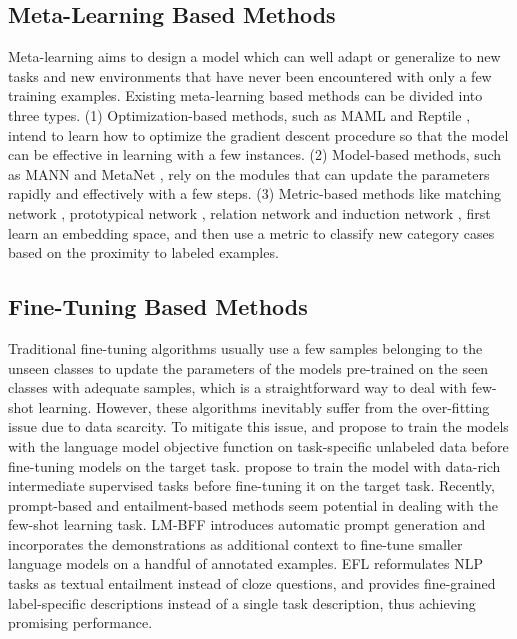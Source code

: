 \documentclass[letterpaper]{article} %
\begin{document}
\subsection{Meta-Learning Based Methods}
Meta-learning aims to design a model which can well adapt or generalize to new tasks and new environments that have never been encountered with only a few training examples. Existing meta-learning based methods can be divided into three types. (1) Optimization-based methods, such as MAML \cite{finn2017model} and Reptile \cite{DBLP:journals/corr/abs-1803-02999}, intend to learn how to optimize the gradient descent procedure so that the model can be effective in learning with a few instances. (2) Model-based methods, such as MANN \cite{mann} and MetaNet \cite{metanet}, rely on the modules that can update the parameters rapidly and effectively with a few steps. (3) Metric-based methods like matching network \cite{matchingnet}, prototypical network \cite{snell2017prototypical}, relation network \cite{relationnet} and induction network \cite{DBLP:conf/emnlp/GengLLZJS19}, first learn an embedding space, and then use a metric to classify new category cases based on the proximity to labeled examples.

\subsection{Fine-Tuning Based Methods}
Traditional fine-tuning algorithms usually use a few samples belonging to the unseen classes to update the parameters of the models pre-trained on the seen classes with adequate samples, which is a straightforward way to deal with few-shot learning. However, these algorithms inevitably suffer from the over-fitting issue due to data scarcity. To mitigate
this issue, \citet{howard-ruder-2018-universal} and \citet{gururangan-etal-2020-dont} propose to train the models with the language model objective function on task-specific unlabeled data before fine-tuning models on the target task. \citet{phang2018sentence} propose to train the model with data-rich intermediate supervised tasks before fine-tuning it on the target task. Recently, prompt-based and entailment-based methods seem potential in dealing with the few-shot learning task. LM-BFF \cite{lmbff} introduces automatic prompt generation and incorporates the demonstrations as additional context to fine-tune smaller language models on a handful of annotated examples. EFL \cite{efl} reformulates NLP tasks as textual entailment instead of cloze questions, and provides fine-grained label-specific descriptions instead of a single task description, thus achieving promising performance.
\end{document}
